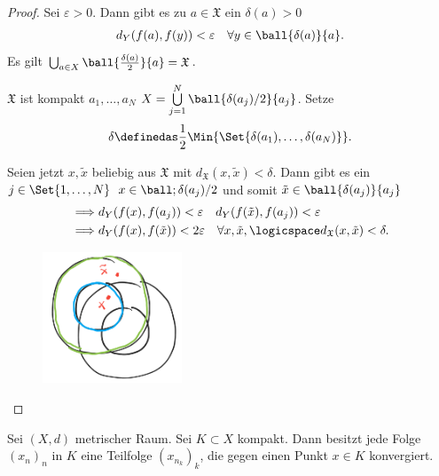 \begin{proof}
    Sei \( \varepsilon>0 \). Dann gibt es zu \( a\in \mathfrak{X} \) ein \( \delta(a)>0 \) \sd
    \begin{align*}
        d_Y(f(a),f(y))<\varepsilon\quad \forall y\in \ball{\delta(a)}{a}.
    \end{align*}
    Es gilt \( \bigcup_{a\in X} \ball{\frac{\delta(a)}{2}}{a}=\mathfrak{X}\).

    \( \mathfrak{X} \) ist kompakt \timplies \texists \( a_1,\ldots,a_N \) \sd \( X=\bigcup\limits_{j=1}^{N}\ball{\delta(a_j)/2}{a_j}\). Setze 
    \begin{align*}
        \delta\definedas \frac{1}{2}\Min{\Set{\delta(a_1),\ldots,\delta(a_N)}}.
    \end{align*}

    Seien jetzt \( x,\tilde{x} \) beliebig aus \( \mathfrak{X} \) mit \( d_{\mathfrak{X}}(x,\tilde{x})<\delta \). Dann gibt es ein \( j\in \Set{1,\ldots, N} \) \sd \( x\in \ball;{\delta(a_j)/2} \) und somit \( \tilde{x}\in \ball{\delta(a_j)}{a_j} \)
    \begin{align*}
        \implies &d_Y(f(x),f(a_j))<\varepsilon \quad d_Y(f(\tilde{x}),f(a_j))<\varepsilon\\
        \implies &d_Y(f(x),f(\tilde{x}))<2\varepsilon \quad \forall x,\tilde{x},\logicspace d_{\mathfrak{X}}(x,\tilde{x})<\delta.
    \end{align*}
    \begin{figure}[H]
        \centering
        \includegraphics[width=0.4\linewidth]{figures/doppel_doppel_ball}
        \label{fig:doppel_doppel_ball}
    \end{figure}
    
\end{proof}
\begin{satz}\label{bolzanoweierstrass}
    Sei \( (X,d) \) metrischer Raum. Sei \( K\subset X \) kompakt. Dann besitzt jede Folge \( (x_n)_n \) in \( K \) eine Teilfolge \( (x_{n_k})_k \), die gegen einen Punkt \( x\in K \) konvergiert. 
\end{satz}

